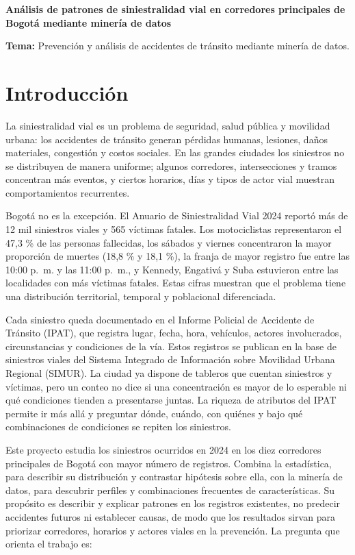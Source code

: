 \documentclass[12pt,letterpaper]{article}
\begin{document}
\tableofcontents
\clearpage

\begin{center}
{\bfseries\large Análisis de patrones de siniestralidad vial en corredores principales de Bogotá mediante minería de datos}
\end{center}

\textbf{Tema:} Prevención y análisis de accidentes de tránsito mediante minería de datos.

\hypertarget{introducciuxf3n}{%
\section{Introducción}\label{introducciuxf3n}}

La siniestralidad vial es un problema de seguridad, salud pública y
movilidad urbana: los accidentes de tránsito generan pérdidas humanas,
lesiones, daños materiales, congestión y costos sociales. En las grandes
ciudades los siniestros no se distribuyen de manera uniforme; algunos
corredores, intersecciones y tramos concentran más eventos, y ciertos
horarios, días y tipos de actor vial muestran comportamientos
recurrentes.

Bogotá no es la excepción. El Anuario de Siniestralidad Vial 2024
\citep{sdm2024} reportó más de 12 mil siniestros viales y 565 víctimas fatales. Los
motociclistas representaron el 47,3 \% de las personas fallecidas, los
sábados y viernes concentraron la mayor proporción de muertes (18,8 \% y
18,1 \%), la franja de mayor registro fue entre las 10:00 p.~m. y las
11:00 p.~m., y Kennedy, Engativá y Suba estuvieron entre las localidades
con más víctimas fatales. Estas cifras muestran que el problema tiene
una distribución territorial, temporal y poblacional diferenciada.

Cada siniestro queda documentado en el Informe Policial de Accidente de
Tránsito (IPAT), que registra lugar, fecha, hora, vehículos, actores
involucrados, circunstancias y condiciones de la vía. Estos registros se
publican en la base de siniestros viales del Sistema Integrado de
Información sobre Movilidad Urbana Regional (SIMUR). La ciudad ya
dispone de tableros que cuentan siniestros y víctimas, pero un conteo no
dice si una concentración es mayor de lo esperable ni qué condiciones
tienden a presentarse juntas. La riqueza de atributos del IPAT permite
ir más allá y preguntar dónde, cuándo, con quiénes y bajo qué
combinaciones de condiciones se repiten los siniestros.

Este proyecto estudia los siniestros ocurridos en 2024 en los diez
corredores principales de Bogotá con mayor número de registros.
Combina la estadística, para describir su distribución y contrastar
hipótesis sobre ella, con la minería de datos, para descubrir perfiles y
combinaciones frecuentes de características. Su propósito es describir y
explicar patrones en los registros existentes, no predecir accidentes
futuros ni establecer causas, de modo que los resultados sirvan para
priorizar corredores, horarios y actores viales en la prevención. La
pregunta que orienta el trabajo es:
\end{document}
